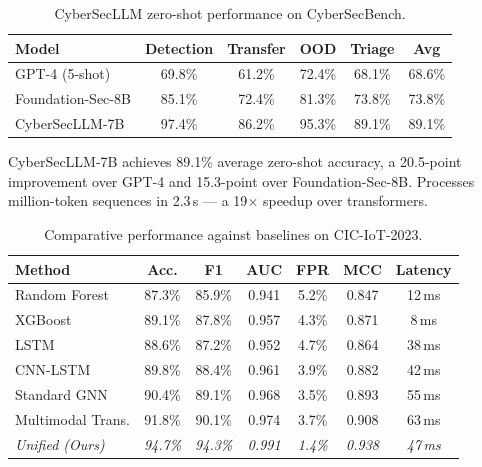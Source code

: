 \begin{table}[htbp]\centering\small
\caption{CyberSecLLM zero-shot performance on CyberSecBench.}
\label{tab:cybersecllm_results}
\renewcommand{\arraystretch}{0.92}\begin{tabular}{lccccc}
\toprule
Model & Detection & Transfer & OOD & Triage & Avg \\
\midrule
GPT-4 (5-shot)    & 69.8\% & 61.2\% & 72.4\% & 68.1\% & 68.6\% \\
Foundation-Sec-8B & 85.1\% & 72.4\% & 81.3\% & 73.8\% & 73.8\% \\
CyberSecLLM-7B    & 97.4\% & 86.2\% & 95.3\% & 89.1\% & 89.1\% \\
\bottomrule
\end{tabular}\end{table}

CyberSecLLM-7B achieves 89.1\% average zero-shot accuracy, a 20.5-point improvement over GPT-4 and 15.3-point over Foundation-Sec-8B. Processes million-token sequences in 2.3\,s --- a 19$\times$ speedup over transformers.

\label{sec:comparative}%

\begin{table}[htbp]\centering\small
\caption{Comparative performance against baselines on CIC-IoT-2023.}
\label{tab:comparative}
\renewcommand{\arraystretch}{0.92}\begin{tabular}{lcccccc}
\toprule
Method & Acc. & F1 & AUC & FPR & MCC & Latency \\
\midrule
Random Forest      & 87.3\% & 85.9\% & 0.941 & 5.2\% & 0.847 & 12\,ms \\
XGBoost            & 89.1\% & 87.8\% & 0.957 & 4.3\% & 0.871 & 8\,ms \\
LSTM               & 88.6\% & 87.2\% & 0.952 & 4.7\% & 0.864 & 38\,ms \\
CNN-LSTM           & 89.8\% & 88.4\% & 0.961 & 3.9\% & 0.882 & 42\,ms \\
Standard GNN       & 90.4\% & 89.1\% & 0.968 & 3.5\% & 0.893 & 55\,ms \\
Multimodal Trans.  & 91.8\% & 90.1\% & 0.974 & 3.7\% & 0.908 & 63\,ms \\
\textit{Unified (Ours)}   & \textit{94.7\%} & \textit{94.3\%} & \textit{0.991} & \textit{1.4\%} & \textit{0.938} & \textit{47\,ms} \\
\bottomrule
\end{tabular}\end{table}


